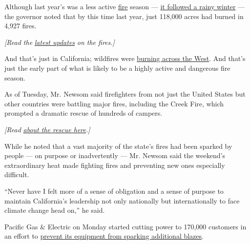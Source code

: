 Although last year's was a less active
\href{https://www.nytimes3xbfgragh.onion/article/wildfires-california-oregon-washington.html}{fire}
season ---
\href{https://www.nytimes3xbfgragh.onion/2019/03/01/us/california-today-extreme-weather-forecast.html}{it
followed a rainy winter} --- the governor noted that by this time last
year, just 118,000 acres had burned in 4,927 fires.

\emph{{[}Read the}
\href{https://www.nytimes3xbfgragh.onion/2020/09/08/us/wildfires-live-updates.html?name=styln-california-wildfires\&region=TOP_BANNER\&block=storyline_menu_recirc\&action=click\&pgtype=Article\&impression_id=69d920f1-f259-11ea-bef8-f7a505c4b1e2\&variant=1_Show}{\emph{latest
updates}} \emph{on the fires.{]}}

And that's just in California; wildfires were
\href{https://www.nytimes3xbfgragh.onion/2020/09/08/us/wildfires-live-updates.html?name=styln-california-wildfires\&region=TOP_BANNER\&block=storyline_menu_recirc\&action=click\&pgtype=Article\&impression_id=68a81b00-f259-11ea-867a-a3448642d022\&variant=1_Show}{burning
across the West}. And that's just the early part of what is likely to be
a highly active and dangerous fire season.

As of Tuesday, Mr. Newsom said firefighters from not just the United
States but other countries were battling major fires, including the
Creek Fire, which prompted a dramatic rescue of hundreds of campers.

\emph{{[}Read}
\href{https://www.nytimes3xbfgragh.onion/2020/09/08/us/california-wildfires-helicopter-rescue.html?referringSource=articleShare}{\emph{about
the rescue here}}\emph{.{]}}

While he noted that a vast majority of the state's fires had been
sparked by people --- on purpose or inadvertently --- Mr. Newsom said
the weekend's extraordinary heat made fighting fires and preventing new
ones especially difficult.

``Never have I felt more of a sense of obligation and a sense of purpose
to maintain California's leadership not only nationally but
internationally to face climate change head on,'' he said.

Pacific Gas \& Electric on Monday started cutting power to 170,000
customers in an effort to
\href{https://www.nytimes3xbfgragh.onion/2020/09/08/us/wildfires-live-updates.html?name=styln-california-wildfires\&region=TOP_BANNER\&block=storyline_menu_recirc\&action=click\&pgtype=Article\&impression_id=69d920f1-f259-11ea-bef8-f7a505c4b1e2\&variant=1_Show\#link-ae8e448}{prevent
its equipment from sparking additional blazes}.

